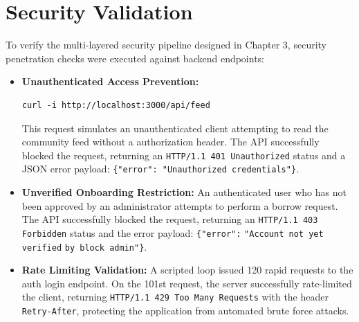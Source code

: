 \section{Security Validation}
To verify the multi-layered security pipeline designed in Chapter 3, security penetration checks were executed against backend endpoints:
\begin{itemize}
    \item \textbf{Unauthenticated Access Prevention:}
    \begin{lstlisting}
curl -i http://localhost:3000/api/feed
    \end{lstlisting}
    This request simulates an unauthenticated client attempting to read the community feed without a authorization header. The API successfully blocked the request, returning an \texttt{HTTP/1.1 401 Unauthorized} status and a JSON error payload: \texttt{\{"error": "Unauthorized credentials"\}}.
    
    \item \textbf{Unverified Onboarding Restriction:}
    An authenticated user who has not been approved by an administrator attempts to perform a borrow request. The API successfully blocked the request, returning an \texttt{HTTP/1.1 403 Forbidden} status and the error payload: \texttt{\{"error":} \allowbreak \texttt{"Account not yet verified} \allowbreak \texttt{by block admin"\}}.
    
    \item \textbf{Rate Limiting Validation:}
    A scripted loop issued 120 rapid requests to the auth login endpoint. On the 101st request, the server successfully rate-limited the client, returning \texttt{HTTP/1.1 429 Too Many Requests} with the header \texttt{Retry-After}, protecting the application from automated brute force attacks.
\end{itemize}


